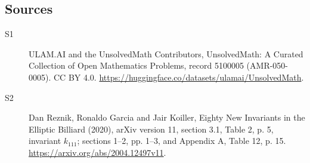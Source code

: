 \documentclass[11pt]{article}
\begin{document}
\subsection{Sources}
\begin{description}
\item[\hypertarget{source:5100005:1}{S1}] ULAM.AI and the UnsolvedMath Contributors, UnsolvedMath: A Curated Collection of Open Mathematics Problems, record 5100005 (AMR-050-0005). CC BY 4.0. \url{https://huggingface.co/datasets/ulamai/UnsolvedMath}.
\item[\hypertarget{source:5100005:2}{S2}] Dan Reznik, Ronaldo Garcia and Jair Koiller, Eighty New Invariants in the Elliptic Billiard (2020), arXiv version 11, section 3.1, Table 2, p. 5, invariant $k_{111}$; sections 1--2, pp. 1--3, and Appendix A, Table 12, p. 15. \url{https://arxiv.org/abs/2004.12497v11}.
\end{description}
\label{end:5100005}
\end{document}
